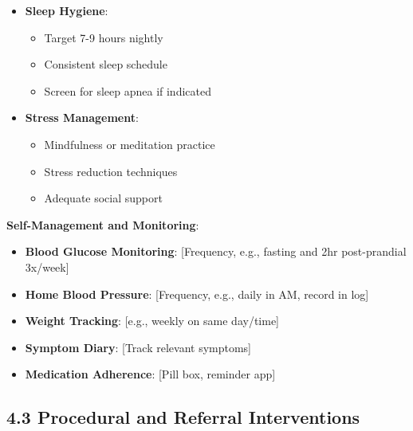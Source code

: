 \documentclass[11pt,letterpaper]{article}
\begin{document}
\begin{itemize}[leftmargin=*]
    \item \textbf{Sleep Hygiene}:
    \begin{itemize}
        \item Target 7-9 hours nightly
        \item Consistent sleep schedule
        \item Screen for sleep apnea if indicated
    \end{itemize}
    
    \item \textbf{Stress Management}:
    \begin{itemize}
        \item Mindfulness or meditation practice
        \item Stress reduction techniques
        \item Adequate social support
    \end{itemize}
\end{itemize}

\textbf{Self-Management and Monitoring}:
\begin{itemize}[leftmargin=*]
    \item \textbf{Blood Glucose Monitoring}: [Frequency, e.g., fasting and 2hr post-prandial 3x/week]
    \item \textbf{Home Blood Pressure}: [Frequency, e.g., daily in AM, record in log]
    \item \textbf{Weight Tracking}: [e.g., weekly on same day/time]
    \item \textbf{Symptom Diary}: [Track relevant symptoms]
    \item \textbf{Medication Adherence}: [Pill box, reminder app]
\end{itemize}

\subsection*{4.3 Procedural and Referral Interventions}
\end{document}
